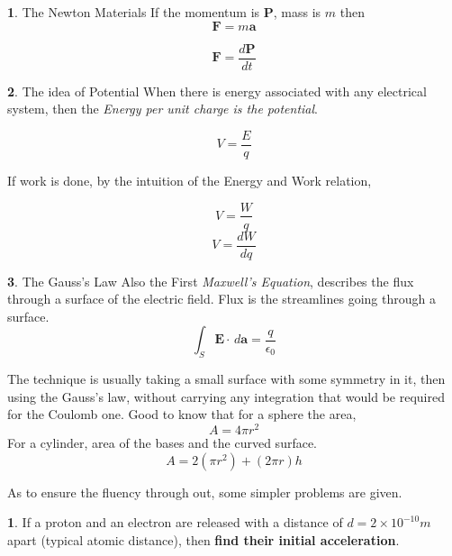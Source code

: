 \documentclass[11pt,a4paper,twocolumn,openright]{article}
\renewcommand{\vec}[1]{\boldsymbol{#1}}
\theoremstyle{definition}
\newtheorem{fct}{ \framebox[0.05\textwidth]{{\sffamily Fact}} }
\theoremstyle{definition}
\newtheorem{pr}{ \framebox[0.05\textwidth]{{\sffamily Pr}} }
\theoremstyle{definition}
\theoremstyle{definition}
\begin{document}
\begin{fct}
\textsf{The Newton Materials}
If the momentum is $\vec{P}$, mass is $m$ then 
\begin{equation}
\vec{F} = m \vec{a}
\end{equation}

\begin{equation}
\vec{F} = \frac{d \vec{P}}{dt}
\end{equation}

\end{fct}


\begin{fct} 

\textsf{The idea of Potential}
%
When there is energy associated with any electrical system, then the \emph{Energy per unit charge is the potential}.

\begin{equation}
V = \frac{E}{q}
\end{equation}

If work is done, by the intuition of the Energy and Work relation, 

\[ V = \frac{W}{q} \]
\[ V = \frac{dW}{dq} \]

\end{fct} 



\begin{fct}
\textsf{The Gauss's Law} Also the First \emph{Maxwell's Equation}, describes the flux through a surface of the electric field. Flux is the streamlines going through a surface. 
\begin{equation}
 \int_{S} \vec{E} \cdot \, d \vec{a} = \frac{q}{\epsilon_0} 
\end{equation}

The technique is usually taking a small surface with some symmetry in it, then using the Gauss's law, without carrying any integration that would be required for the Coulomb one. Good to know that for a sphere the area, 
\[ A = 4 \pi r^2 \]
For a cylinder, area of the bases and the curved surface.
\[ A = 2( \pi r^2 ) + (2 \pi r) h \]

\end{fct}

As to ensure the fluency through out, some simpler problems are given.


\begin{pr}
If a proton and an electron are released with a distance of $d = 2 \times 10^{-10} m$ apart (typical atomic distance), then \textbf{find their initial acceleration}.
\end{pr}
\end{document}
